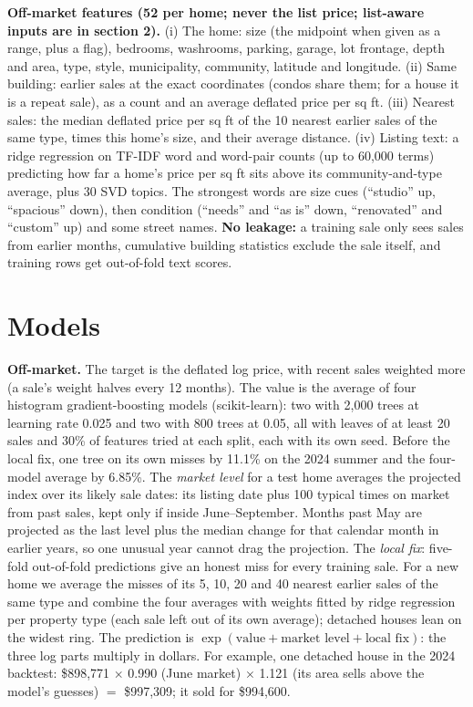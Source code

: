 \documentclass[11pt]{article}
\begin{document}
\textbf{Off-market features (52 per home; never the list price; list-aware inputs are in section 2).}
(i) The home: size (the midpoint when given as a range, plus a flag), bedrooms, washrooms, parking, garage,
lot frontage, depth and area, type, style, municipality, community, latitude and longitude.
(ii) Same building: earlier sales at the exact coordinates (condos share them; for a house it is a repeat
sale), as a count and an average deflated price per sq ft.
(iii) Nearest sales: the median deflated price per sq ft of the 10 nearest earlier sales of the same type,
times this home's size, and their average distance.
(iv) Listing text: a ridge regression on TF-IDF word and word-pair counts (up to 60,000 terms) predicting how
far a home's price per sq ft sits above its community-and-type average, plus 30 SVD topics. The strongest
words are size cues (``studio'' up, ``spacious'' down), then condition (``needs'' and ``as is'' down,
``renovated'' and ``custom'' up) and some street names.
\textbf{No leakage:} a training sale only sees sales from earlier months, cumulative building statistics
exclude the sale itself, and training rows get out-of-fold text scores.

\section{Models}
\textbf{Off-market.} The target is the deflated log price, with recent sales weighted more (a sale's weight
halves every 12 months). The value is the average of four histogram gradient-boosting models
(scikit-learn): two with 2,000 trees at learning rate 0.025 and two with 800 trees at 0.05, all with
leaves of at least 20 sales and 30\% of features tried at each split, each with its own seed. Before the local fix,
one tree on its own misses by 11.1\% on the 2024 summer and the four-model average by 6.85\%.
The \emph{market level} for a test home averages the projected index over its likely sale dates: its listing
date plus 100 typical times on market from past sales, kept only if inside June--September. Months past May
are projected as the last level plus the median change for that calendar month in earlier years, so one
unusual year cannot drag the projection.
The \emph{local fix}: five-fold out-of-fold predictions give an honest miss for every training sale. For a
new home we average the misses of its 5, 10, 20 and 40 nearest earlier sales of the same type and combine
the four averages with weights fitted by ridge regression per property type (each sale left out of its own
average); detached houses lean on the widest ring. The prediction is
$\exp(\textrm{value} + \textrm{market level} + \textrm{local fix})$: the three log parts multiply in dollars.
For example, one detached house in the 2024 backtest: \$898,771 $\times$ 0.990 (June market) $\times$ 1.121
(its area sells above the model's guesses) $=$ \$997,309; it sold for \$994,600.
\end{document}
